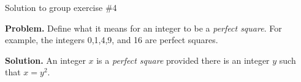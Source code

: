\documentclass[10pt]{beamer}
\begin{document}
\begin{frame}{Solution to group exercise \#4}

\textbf{Problem.} Define what it means for an integer to be a \textit{perfect square}.  For example, the integers 0,1,4,9, and 16 are perfect squares.  

 
\vfill 
\textbf{Solution.} An integer $x$ is a \textit{perfect square} provided there is an integer $y$ such that $x=y^2$.

\end{frame}
\end{document}
